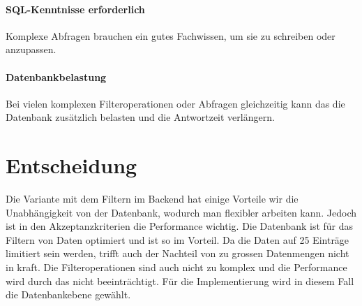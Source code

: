 \paragraph{SQL-Kenntnisse erforderlich} Komplexe Abfragen brauchen ein gutes Fachwissen, um sie zu schreiben oder anzupassen.
\paragraph{Datenbankbelastung} Bei vielen komplexen Filteroperationen oder Abfragen gleichzeitig kann das die Datenbank zusätzlich belasten und die Antwortzeit verlängern.

\section{Entscheidung}
Die Variante mit dem Filtern im Backend hat einige Vorteile wir die Unabhängigkeit von der Datenbank, wodurch man flexibler arbeiten kann. Jedoch ist in den Akzeptanzkriterien die Performance wichtig. Die Datenbank ist für das Filtern von Daten optimiert und ist so im Vorteil. Da die Daten auf 25 Einträge limitiert sein werden, trifft auch der Nachteil von zu grossen Datenmengen nicht in kraft. Die Filteroperationen sind auch nicht zu komplex und die Performance wird durch das nicht beeinträchtigt. Für die Implementierung wird in diesem Fall die Datenbankebene gewählt.
\newpage